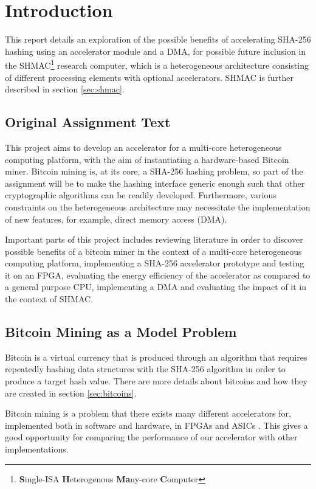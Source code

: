 \chapter{Introduction}

This report details an exploration of the possible benefits of accelerating
SHA-256 hashing using an accelerator module and a DMA, for possible future
inclusion in the SHMAC\footnote{\textbf{S}ingle-ISA \textbf{H}eterogenous
\textbf{Ma}ny-core \textbf{C}omputer} research computer, which is a
heterogeneous architecture consisting of different processing elements with
optional accelerators. SHMAC is further described in section \ref{sec:shmac}.

\section{Original Assignment Text}

This project aims to develop an accelerator for a multi-core heterogeneous
computing platform, with the aim of instantiating a hardware-based Bitcoin miner.
Bitcoin mining is, at its core, a SHA-256 hashing problem, so part of the
assignment will be to make the hashing interface generic enough such that other
cryptographic algorithms can be readily developed. Furthermore, various constraints
on the heterogeneous architecture may necessitate the implementation of new
features, for example, direct memory access (DMA).

Important parts of this project includes reviewing literature in order to discover
possible benefits of a bitcoin miner in the context of a multi-core heterogeneous
computing platform, implementing a SHA-256 accelerator prototype and testing it on
an FPGA, evaluating the energy efficiency of the accelerator as compared to a
general purpose CPU, implementing a DMA and evaluating the impact of it in the context
of SHMAC.

\section{Bitcoin Mining as a Model Problem}

Bitcoin is a virtual currency that is produced through an algorithm that
requires repeatedly hashing data structures with the SHA-256 algorithm
in order to produce a target hash value. There are more details about
bitcoins and how they are created in section \ref{sec:bitcoins}.

Bitcoin mining is a problem that there exists many different accelerators
for, implemented both in software and hardware, in FPGAs and ASICs \cite{bespoke-silicon}.
This gives a good opportunity for comparing the performance of our
accelerator with other implementations.

